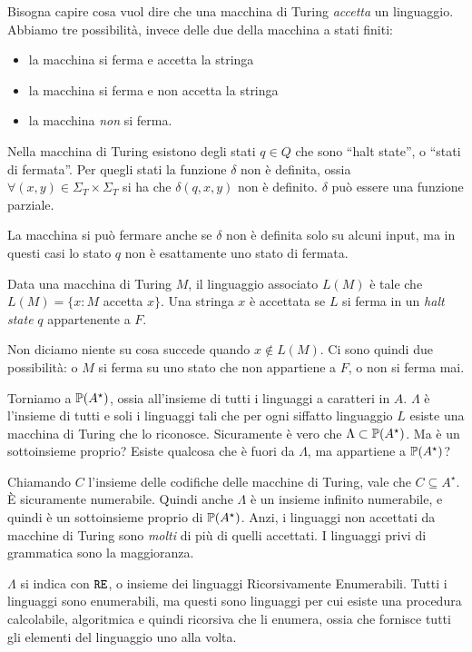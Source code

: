 Bisogna capire cosa vuol dire che una macchina di Turing \emph{accetta} un linguaggio. Abbiamo tre possibilit\`a, invece delle due della macchina a stati finiti:
\begin{itemize}
    \item la macchina si ferma e accetta la stringa
    \item la macchina si ferma e non accetta la stringa
    \item la macchina \emph{non} si ferma.
\end{itemize}

Nella macchina di Turing esistono degli stati $q \in Q$ che sono ``halt state'', o ``stati di fermata''. Per quegli stati la funzione $\delta$ non \`e definita, ossia $\forall (x,y) \in \Sigma_T \times \Sigma_T$ si ha che $\delta(q,x,y)$ non \`e definito. $\delta$ pu\`o essere una funzione parziale.

La macchina si pu\`o fermare anche se $\delta$ non \`e definita solo su alcuni input, ma in questi casi lo stato $q$ non \`e esattamente uno stato di fermata.

\begin{defn}
Data una macchina di Turing $M$, il linguaggio associato $L(M)$ \`e tale che $L(M) = \{ x : M $ accetta $ x \}$. Una stringa $x$ \`e accettata se $L$ si ferma in un \emph{halt state} $q$ appartenente a $F$.
\end{defn}

Non diciamo niente su cosa succede quando $x \notin L(M)$. Ci sono quindi due possibilit\`a: o $M$ si ferma su uno stato che non appartiene a $F$, o non si ferma mai.

Torniamo a $\mathbb{P} (A^{\star})$, ossia all'insieme di tutti i linguaggi a caratteri in $A$. $\Lambda$ \`e l'insieme di tutti e soli i linguaggi tali che per ogni siffatto linguaggio $L$ esiste una macchina di Turing che lo riconosce. Sicuramente \`e vero che $\Lambda \subset \mathbb{P} (A^{\star})$. Ma \`e un sottoinsieme proprio? Esiste qualcosa che \`e fuori da $\Lambda$, ma appartiene a $\mathbb{P}(A^{\star})$?

Chiamando $C$ l'insieme delle codifiche delle macchine di Turing, vale che $C \subseteq A^{\star}$. \`E sicuramente numerabile. Quindi anche $\Lambda$ \`e un insieme infinito numerabile, e quindi \`e un sottoinsieme proprio di $\mathbb{P} (A^{\star})$. Anzi, i linguaggi non accettati da macchine di Turing sono \emph{molti} di pi\`u di quelli accettati. I linguaggi privi di grammatica sono la maggioranza.

$\Lambda$ si indica con $\texttt{RE}$, o insieme dei linguaggi Ricorsivamente Enumerabili. Tutti i linguaggi sono enumerabili, ma questi sono linguaggi per cui esiste una procedura calcolabile, algoritmica e quindi ricorsiva che li enumera, ossia che fornisce tutti gli elementi del linguaggio uno alla volta.

